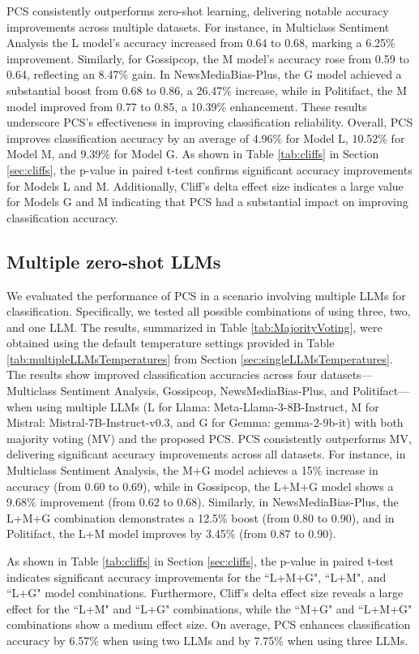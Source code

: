 PCS consistently outperforms zero-shot learning, delivering notable accuracy improvements across multiple datasets. For instance, in Multiclass Sentiment Analysis the L model's accuracy increased from 0.64 to 0.68, marking a 6.25\% improvement. Similarly, for Gossipcop, the M model's accuracy rose from 0.59 to 0.64, reflecting an 8.47\% gain. In NewsMediaBias-Plus, the G model achieved a substantial boost from 0.68 to 0.86, a 26.47\% increase, while in Politifact, the M model improved from 0.77 to 0.85, a 10.39\% enhancement. These results underscore PCS's effectiveness in improving classification reliability. Overall, PCS improves classification accuracy by an average of 4.96\% for Model L, 10.52\% for Model M, and 9.39\% for Model G. As shown in Table \ref{tab:cliffs} in Section \ref{sec:cliffs}, the p-value in paired t-test confirms significant accuracy improvements for Models L and M. Additionally, Cliff's delta effect size indicates a large value for Models G and M indicating that PCS had a substantial impact on improving classification accuracy.

\subsection{Multiple zero-shot LLMs}
We evaluated the performance of PCS in a scenario involving multiple LLMs for classification. Specifically, we tested all possible combinations of using three, two, and one LLM. The results, summarized in Table \ref{tab:MajorityVoting}, were obtained using the default temperature settings provided in Table \ref{tab:multipleLLMsTemperatures} from Section \ref{sec:singleLLMsTemperatures}.
The results show improved classification accuracies across four datasets—Multiclass Sentiment Analysis, Gossipcop, NewsMediaBias-Plus, and Politifact—when using multiple LLMs (L for Llama: Meta-Llama-3-8B-Instruct, M for Mistral: Mistral-7B-Instruct-v0.3, and G for Gemma: gemma-2-9b-it) with both majority voting (MV) and the proposed PCS. PCS consistently outperforms MV, delivering significant accuracy improvements across all datasets. For instance, in Multiclass Sentiment Analysis, the M+G model achieves a 15\% increase in accuracy (from 0.60 to 0.69), while in Gossipcop, the L+M+G model shows a 9.68\% improvement (from 0.62 to 0.68). Similarly, in NewsMediaBias-Plus, the L+M+G combination demonstrates a 12.5\% boost (from 0.80 to 0.90), and in Politifact, the L+M model improves by 3.45\% (from 0.87 to 0.90). 

As shown in Table \ref{tab:cliffs} in Section \ref{sec:cliffs}, the p-value in paired t-test indicates significant accuracy improvements for the ``L+M+G", ``L+M", and ``L+G" model combinations. Furthermore, Cliff's delta effect size reveals a large effect for the ``L+M" and ``L+G" combinations, while the ``M+G" and ``L+M+G" combinations show a medium effect size. On average, PCS enhances classification accuracy by 6.57\% when using two LLMs and by 7.75\% when using three LLMs. 

